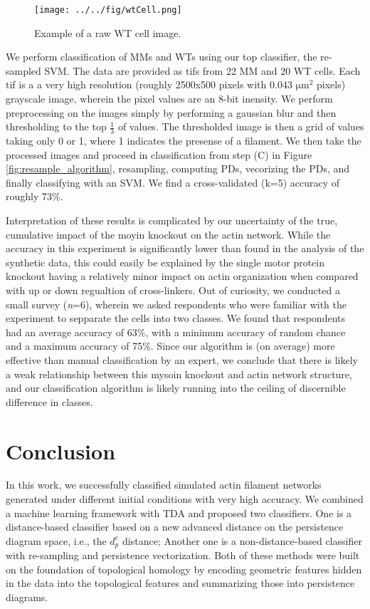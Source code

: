 \documentclass[10pt]{article}
\begin{document}
\begin{figure}[H]
	\begin{center}
		\texttt{[image: ../../fig/wtCell.png]}
	\end{center}
	\caption{Example of a raw WT cell image.}
	\label{fig:wtCell}
\end{figure}

We perform classification of MMs and WTs using our top classifier, the re-sampled SVM. The data are provided as tifs from 22 MM and 20 WT cells. Each tif is a a very high resolution (roughly 2500x500 pixels with 0.043 $\mathrm{\mu m}^2$ pixels) grayscale image, wherein the pixel values are an 8-bit inensity. We perform preprocessing on the images simply by performing a gaussian blur and then thresholding to the top $\frac{1}{3}$ of values. The thresholded image is then a grid of values taking only 0 or 1, where 1 indicates the presense of a filament. We then take the processed images and proceed in classification from step (C) in Figure \ref{fig:resample_algorithm}, resampling, computing PDs, vecorizing the PDs, and finally classifying with an SVM. We find a cross-validated (k=5) accuracy of roughly 73\%.

Interpretation of these results is complicated by our uncertainty of the true, cumulative impact of the moyin knockout on the actin network. While the accuracy in this experiment is significantly lower than found in the analysis of the synthetic data, this could easily be explained by the single motor protein knockout having a relatively minor impact on actin organization when compared with up or down regualtion of cross-linkers. Out of curiosity, we conducted a small survey (\textit{n}=6), wherein we asked respondents who were familiar with the experiment to sepparate the cells into two classes. We found that respondents had an average accuracy of 63\%, with a minimum accuracy of random chance and a maximum accuracy of 75\%. Since our algorithm is (on average) more effective than manual classification by an expert, we conclude that there is likely a weak relationship between this mysoin knockout and actin network structure, and our classification algorithm is likely running into the ceiling of discernible difference in classes.


\section{Conclusion}
In this work, we successfully classified simulated actin filament networks generated under different initial conditions with very high accuracy. We combined a machine learning framework with TDA and proposed two classifiers. One is a distance-based classifier based on a new advanced distance on the persistence diagram space, i.e., the $d^c_p$ distance; Another one is a non-distance-based classifier with re-sampling and persistence vectorization. Both of these methods were built on the foundation of topological homology by encoding geometric features hidden in the data into the topological features and summarizing those into persistence diagrams.
\end{document}
